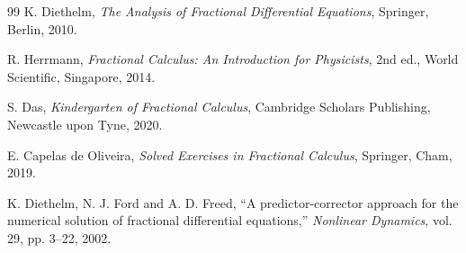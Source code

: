 \documentclass[11pt,a4paper]{article}
\begin{document}
\begin{thebibliography}{99}
K. Diethelm, \emph{The Analysis of Fractional Differential Equations}, Springer,
Berlin, 2010.

R. Herrmann, \emph{Fractional Calculus: An Introduction for Physicists}, 2nd ed.,
World Scientific, Singapore, 2014.

S. Das, \emph{Kindergarten of Fractional Calculus}, Cambridge Scholars Publishing,
Newcastle upon Tyne, 2020.

E. Capelas de Oliveira, \emph{Solved Exercises in Fractional Calculus}, Springer,
Cham, 2019.

K. Diethelm, N. J. Ford and A. D. Freed, ``A predictor-corrector approach for the
numerical solution of fractional differential equations,'' \emph{Nonlinear Dynamics},
vol. 29, pp. 3--22, 2002.

\end{thebibliography}
\end{document}

